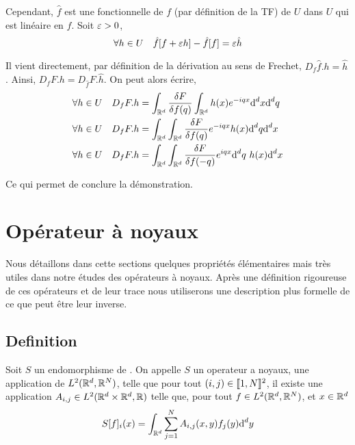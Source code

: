 \documentclass[10pt]{article}
\begin{document}
\begin{multicols}{2}
Cependant, $\hat{f}$ est une fonctionnelle de $f$ (par définition de la TF) de $U$ dans $U$ qui est linéaire en $f$. Soit $\varepsilon >0$, 
\begin{equation}
  \forall h \in U \quad \hat{f}[f + \varepsilon h] - \hat{f}[f] = \varepsilon \hat{h} 
\end{equation} 

Il vient directement, par définition de la dérivation au sens de Frechet, $D_f\hat{f} .h = \hat{h}$.  
Ainsi,  $D_f F .h = D_{\hat{f}}F.\hat{h}$.  On peut alors écrire, 
\begin{align}
  \forall h \in U  \quad D_f F .h & = \int_{\mathbb{R}^d} \frac{\delta F}{\delta f(q)} \int_{\mathbb{R}^d} h(x) e^{-iqx} \text{d}^d x \text{d}^d q \\
  \forall h \in U  \quad D_f F .h & = \int_{\mathbb{R}^d} \int_{\mathbb{R}^d} \frac{\delta F}{\delta f(q)} e^{-iqx} h(x) \text{d}^d q \text{d}^d x \\
  \forall h \in U  \quad D_f F .h & = \int_{\mathbb{R}^d} \int_{\mathbb{R}^d} \frac{\delta F}{\delta f(-q)} e^{iqx} \text{d}^d q \text{ } h(x) \text{d}^d x
\end{align}

Ce qui permet de conclure la démonstration.

\vspace*{11pt}

\end{multicols}


\pagebreak

\section{Opérateur à noyaux}

Nous détaillons dans cette sections quelques propriétés élémentaires mais très utiles dans notre études des opérateurs à noyaux. Après une définition rigoureuse de ces opérateurs et de leur trace nous utiliserons une description plus formelle de ce que peut être leur inverse.\\



\subsection{Definition}

Soit $S$ un endomorphisme de . On appelle $S$ un operateur a noyaux, une application de $L^2(\mathbb{R}^d, \mathbb{R}^N)$, telle que pour tout $(i,j) \in  \llbracket 1,N \rrbracket ^2$, il existe une application $A_{i,j} \in L^2(\mathbb{R}^d\times\mathbb{R}^d, \mathbb{R})$ telle que,  pour tout $f \in L^2(\mathbb{R}^d, \mathbb{R}^N)$, et $x \in \mathbb{R}^d$ 
 \begin{equation}
  S[f]_i(x) = \int_{\mathbb{R}^d} \sum_{j=1}^{N} A_{i,j}(x,y)f_j(y) \text{d}^d y
 \end{equation}
\end{document}

